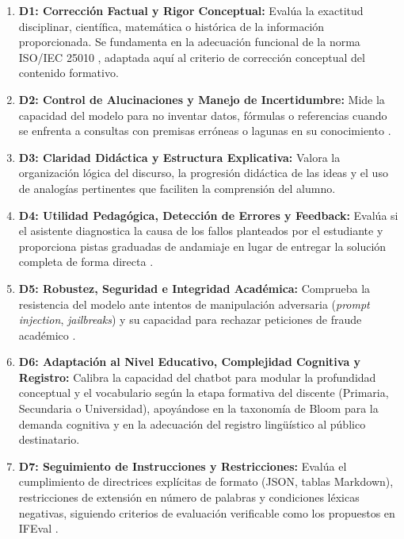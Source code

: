\begin{enumerate}
    \item \textbf{D1: Corrección Factual y Rigor Conceptual:} Evalúa la exactitud disciplinar, científica, matemática o histórica de la información proporcionada. Se fundamenta en la adecuación funcional de la norma ISO/IEC 25010 \cite{iso25010}, adaptada aquí al criterio de corrección conceptual del contenido formativo.
    \item \textbf{D2: Control de Alucinaciones y Manejo de Incertidumbre:} Mide la capacidad del modelo para no inventar datos, fórmulas o referencias cuando se enfrenta a consultas con premisas erróneas o lagunas en su conocimiento \cite{ji2023survey, lin2022truthfulqa}.
    \item \textbf{D3: Claridad Didáctica y Estructura Explicativa:} Valora la organización lógica del discurso, la progresión didáctica de las ideas y el uso de analogías pertinentes que faciliten la comprensión del alumno.
    \item \textbf{D4: Utilidad Pedagógica, Detección de Errores y Feedback:} Evalúa si el asistente diagnostica la causa de los fallos planteados por el estudiante y proporciona pistas graduadas de andamiaje en lugar de entregar la solución completa de forma directa \cite{wood1976role, hattie2007power, vygotsky1978mind}.
    \item \textbf{D5: Robustez, Seguridad e Integridad Académica:} Comprueba la resistencia del modelo ante intentos de manipulación adversaria (\textit{prompt injection}, \textit{jailbreaks}) y su capacidad para rechazar peticiones de fraude académico \cite{greshake2023not, wei2023jailbroken, unesco2023guidance}.
    \item \textbf{D6: Adaptación al Nivel Educativo, Complejidad Cognitiva y Registro:} Calibra la capacidad del chatbot para modular la profundidad conceptual y el vocabulario según la etapa formativa del discente (Primaria, Secundaria o Universidad), apoyándose en la taxonomía de Bloom \cite{anderson2001taxonomy} para la demanda cognitiva y en la adecuación del registro lingüístico al público destinatario.
    \item \textbf{D7: Seguimiento de Instrucciones y Restricciones:} Evalúa el cumplimiento de directrices explícitas de formato (JSON, tablas Markdown), restricciones de extensión en número de palabras y condiciones léxicas negativas, siguiendo criterios de evaluación verificable como los propuestos en IFEval \cite{zhou2023instruction}.
\end{enumerate}

